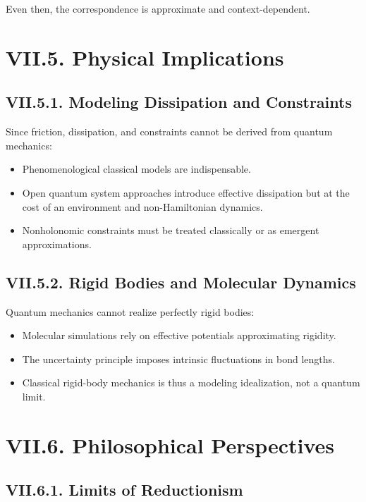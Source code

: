\documentclass[12pt,oneside]{book}
\theoremstyle{plain}
\theoremstyle{definition}
\begin{document}
Even then, the correspondence is approximate and context-dependent.

\section{VII.5. Physical Implications}

\subsection*{VII.5.1. Modeling Dissipation and Constraints}

Since friction, dissipation, and constraints cannot be derived from quantum mechanics:

\begin{itemize}
    \item Phenomenological classical models are indispensable.
    \item Open quantum system approaches introduce effective dissipation but at the cost of an environment and non-Hamiltonian dynamics.
    \item Nonholonomic constraints must be treated classically or as emergent approximations.
\end{itemize}

\subsection*{VII.5.2. Rigid Bodies and Molecular Dynamics}

Quantum mechanics cannot realize perfectly rigid bodies:

\begin{itemize}
    \item Molecular simulations rely on effective potentials approximating rigidity.
    \item The uncertainty principle imposes intrinsic fluctuations in bond lengths.
    \item Classical rigid-body mechanics is thus a modeling idealization, not a quantum limit.
\end{itemize}

\section{VII.6. Philosophical Perspectives}

\subsection*{VII.6.1. Limits of Reductionism}
\end{document}
